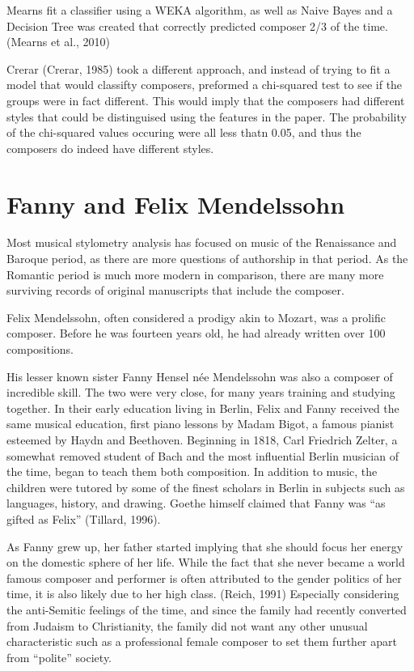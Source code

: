 \documentclass[12pt,twoside]{reedthesis}
\theoremstyle{definition}
\theoremstyle{definition}
\theoremstyle{definition}
\theoremstyle{remark}
\begin{document}
Mearns fit a classifier using a WEKA algorithm, as well as Naive Bayes
and a Decision Tree was created that correctly predicted composer 2/3 of
the time. (Mearns et al., 2010)

Crerar (Crerar, 1985) took a different approach, and instead of trying
to fit a model that would classifty composers, preformed a chi-squared
test to see if the groups were in fact different. This would imply that
the composers had different styles that could be distinguised using the
features in the paper. The probability of the chi-squared values
occuring were all less thatn 0.05, and thus the composers do indeed have
different styles.

\section{Fanny and Felix Mendelssohn}\label{fanny-and-felix-mendelssohn}

Most musical stylometry analysis has focused on music of the Renaissance
and Baroque period, as there are more questions of authorship in that
period. As the Romantic period is much more modern in comparison, there
are many more surviving records of original manuscripts that include the
composer.

Felix Mendelssohn, often considered a prodigy akin to Mozart, was a
prolific composer. Before he was fourteen years old, he had already
written over 100 compositions.

His lesser known sister Fanny Hensel née Mendelssohn was also a composer
of incredible skill. The two were very close, for many years training
and studying together. In their early education living in Berlin, Felix
and Fanny received the same musical education, first piano lessons by
Madam Bigot, a famous pianist esteemed by Haydn and Beethoven. Beginning
in 1818, Carl Friedrich Zelter, a somewhat removed student of Bach and
the most influential Berlin musician of the time, began to teach them
both composition. In addition to music, the children were tutored by
some of the finest scholars in Berlin in subjects such as languages,
history, and drawing. Goethe himself claimed that Fanny was ``as gifted
as Felix'' (Tillard, 1996).

As Fanny grew up, her father started implying that she should focus her
energy on the domestic sphere of her life. While the fact that she never
became a world famous composer and performer is often attributed to the
gender politics of her time, it is also likely due to her high class.
(Reich, 1991) Especially considering the anti-Semitic feelings of the
time, and since the family had recently converted from Judaism to
Christianity, the family did not want any other unusual characteristic
such as a professional female composer to set them further apart from
``polite'' society.
\end{document}
